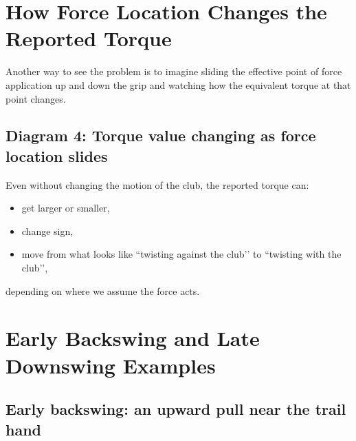 \documentclass[12pt]{article}
\begin{document}
\section{How Force Location Changes the Reported Torque}

Another way to see the problem is to imagine sliding the effective point of force application up and down the grip and watching how the equivalent torque at that point changes.

\subsection*{Diagram 4: Torque value changing as force location slides}

\begin{center}
\end{center}

Even without changing the motion of the club, the reported torque can:
\begin{itemize}
    \item get larger or smaller,
    \item change sign,
    \item move from what looks like ``twisting against the club’’ to ``twisting with the club’’,
\end{itemize}
depending on where we assume the force acts.

\section{Early Backswing and Late Downswing Examples}

\subsection{Early backswing: an upward pull near the trail hand}
\end{document}
